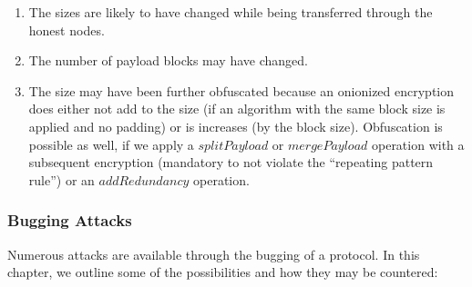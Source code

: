 \begin{enumerate}
	\item The sizes are likely to have changed while being transferred through the honest nodes.
	\item The number of payload blocks may have changed.
	\item The size may have been further obfuscated because an onionized encryption does either not add to the size (if an algorithm with the same block size is applied and no padding) or is increases (by the block size). Obfuscation is possible as well, if we apply a $splitPayload$ or $mergePayload$ operation with a subsequent encryption (mandatory to not violate the ``repeating pattern rule'') or an $addRedundancy$ operation.
\end{enumerate}

\subsubsection{Bugging Attacks}
Numerous attacks are available through the bugging of a protocol. In this chapter, we outline some of the possibilities and how they may be countered:

